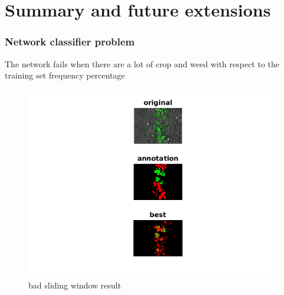 \documentclass{beamer}
\begin{document}
\section{Summary and future extensions}

\begin{frame}
\frametitle{Network classifier problem}
The network fails when there are a lot of crop and weed with respect to the training set frequency percentage

\begin{figure}[h]
	\begin{center}
		\includegraphics[scale=0.62]{15.png}
		\caption{bad sliding window result}
		\label{fig:bad sliding window result}
	\end{center}
\end{figure}

\end{frame}
\end{document}
